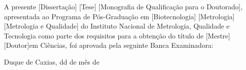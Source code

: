 %
% 
%
%
\begin{folhadeaprovacao}

 \begin{center}
    {\ABNTEXchapterfont\large\imprimirautor}

    \vspace*{\fill}\vspace*{\fill}
    \begin{center}
      \ABNTEXchapterfont\bfseries\Large\imprimirtitulo
    \end{center}
    \vspace*{\fill}
    
    \hspace{.45\textwidth}
    \begin{minipage}{.5\textwidth}
       A presente [Dissertação] [Tese] [Monografia de Qualificação para o Doutorado], apresentada ao Programa de Pós-Graduação em [Biotecnologia] [Metrologia] [Metrologia e Qualidade] do Instituto Nacional de Metrologia, Qualidade e Tecnologia como parte dos requisitos para a obtenção do título de [Mestre] [Doutor]em Ciências, foi aprovada pela seguinte Banca Examinadora:
    \end{minipage}%
    \vspace*{\fill}
   \end{center}
        

      
   \begin{center}
    \vspace*{0.5cm}
    {\large Duque de Caxias, dd de mês de \imprimirdata}
    \vspace*{1cm}
  \end{center}
  
  
\end{folhadeaprovacao}
